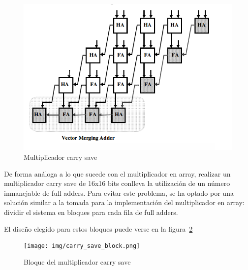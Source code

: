 \documentclass[a4paper,12pt]{article}
\begin{document}
\begin{figure}[hbt]
\includegraphics[width=\textwidth]{img/carry_save_mult.png} 
\caption{Multiplicador carry save} \label{fig:carry_save_multiplier}
\end{figure}

De forma análoga a lo que sucede con el multiplicador en array, realizar un multiplicador carry save de 16x16 bits conlleva la utilización de un número inmanejable de full adders. Para evitar este problema, se ha optado por una solución similar a la tomada para la implementación del multiplicador en array: dividir el sistema en bloques para cada fila de full adders.

El diseño elegido para estos bloques puede verse en la figura~\ref{fig:carry_save_block}

\begin{figure}[hbt]
\texttt{[image: img/carry\_save\_block.png]} 
\caption{Bloque del multiplicador carry save} \label{fig:carry_save_block}
\end{figure}
\end{document}
